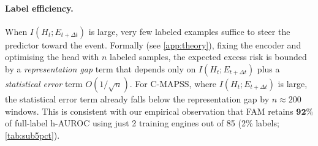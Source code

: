 \paragraph{Label efficiency.}
When $I(H_t; E_{t+\Delta t})$ is large, very few labeled examples suffice to steer the predictor toward the event.
Formally (see \cref{app:theory}), fixing the encoder and optimising the head with $n$ labeled samples, the expected excess risk is bounded by a \emph{representation gap} term that depends only on $I(H_t; E_{t+\Delta t})$ plus a \emph{statistical error} term $O(1/\sqrt{n})$.
For C-MAPSS, where $I(H_t; E_{t+\Delta t})$ is large, the statistical error term already falls below the representation gap by $n \approx 200$ windows.
This is consistent with our empirical observation that FAM retains $\mathbf{92\%}$ of full-label h-AUROC using just 2 training engines out of 85 (2\% labels; \cref{tab:sub5pct}).
